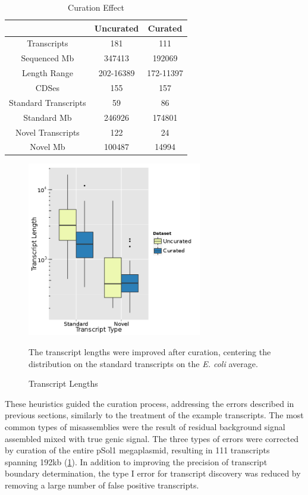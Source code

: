 \begin{table}
\caption{Curation Effect}\label{table:assemb_curation}
\begin{center}
\begin{tabular}{|c|c|c|}\hline
  & Uncurated & Curated\\\hline\hline
Transcripts & 181 & 111\\\hline
Sequenced Mb & 347413 & 192069\\\hline
Length Range & 202-16389 & 172-11397\\\hline
CDSes & 155 & 157\\\hline
Standard Transcripts & 59 & 86\\\hline
Standard Mb & 246926 & 174801\\\hline
Novel Transcripts & 122 & 24\\\hline
Novel Mb & 100487 & 14994\\\hline
\end{tabular}
\end{center}
\end{table}

\begin{figure}
\small
\vspace{-20pt}
\begin{center}
\includegraphics[width=\linewidth,height=3in]{images/Assembly/Curation/PairvsCuration_length.png}
\end{center}
\vspace{-20pt}
\caption{Transcript Lengths}\label{fig:5.20}
The transcript lengths were improved after curation, centering the distribution on the standard transcripts on the \textit{E. coli} average\cite{86}.
\end{figure}

These heuristics guided the curation process, addressing the errors described in previous sections, similarly to the treatment of the example transcripts. The most common types of misassemblies were the result of residual background signal assembled mixed with true genic signal. The three types of errors were corrected by curation of the entire pSol1 megaplasmid, resulting in 111 transcripts spanning 192kb (\ref{table:assemb_curation}). In addition to improving the precision of transcript boundary determination, the type I error for transcript discovery was reduced by removing a large number of false positive transcripts.

